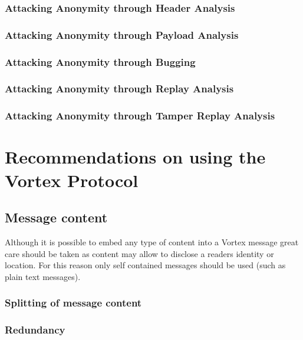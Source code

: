 \subsection{Attacking Anonymity through Header Analysis}

\subsection{Attacking Anonymity through Payload Analysis}

\subsection{Attacking Anonymity through Bugging}

\subsection{Attacking Anonymity through Replay Analysis}

\subsection{Attacking Anonymity through Tamper Replay Analysis}

\chapter{Recommendations on using the Vortex Protocol}

\section{Message content}
Although it is possible to embed any type of content into a Vortex message great care should be taken as content may allow to disclose a readers identity or location. For this reason only self contained messages should be used (such as plain text messages).

\subsection{Splitting of message content}


\subsection{Redundancy}


